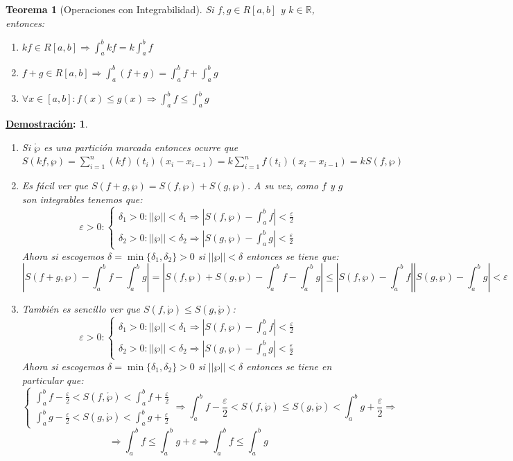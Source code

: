 \documentclass[10pt,a4paper,openright]{book}
\theoremstyle{break}
\newtheorem*{theo}{Teorema}
\newtheorem*{demo}{\underline{Demostración}:}
\begin{document}
\begin{theo}[Operaciones con Integrabilidad]
Si $f,g\in R[a,b]$ y $k\in \mathbb R$, entonces:
\begin{enumerate}
\item $kf\in R[a,b]\Rightarrow \int_a^b kf = k\int_a^b f$
\item $f+g\in R[a,b]\Rightarrow \int_a^b (f+g)=\int_a^b f+\int_a^b g$
\item $\forall x\in [a,b]: f(x)\leq g(x)\Rightarrow \int_a^b f \leq \int_a^b g$
\end{enumerate}
\end{theo}
\begin{demo}
\begin{enumerate}
\item Si $\mathring{\wp}$ es una partición marcada entonces ocurre que $S(kf,\wp) = \sum_{i=1}^n(kf)(t_i)(x_i-x_{i-1})=k\sum_{i=1}^n f(t_i)(x_i-x_{i-1})=kS(f,\wp)$

\item Es fácil ver que $S(f+g, \wp)=S(f,\wp)+S(g,\wp)$. A su vez, como $f$ y $g$ son integrables tenemos que:
$$\varepsilon > 0 : \begin{cases}\delta_1>0: ||\wp ||<\delta_1\Rightarrow \left|S(f,\wp)-\int_a^b f\right|<\frac{\varepsilon}{2} \\ \delta_2>0: ||\wp ||<\delta_2\Rightarrow \left|S(g,\wp)-\int_a^b g\right|<\frac{\varepsilon}{2}  \end{cases}$$
Ahora si escogemos $\delta = \min\{\delta_1, \delta_2\}>0$ si $||\wp ||<\delta$ entonces se tiene que:
$$\left| S(f+g,\wp)-\int_a^b f-\int_a^b g \right|=\left|S(f,\wp)+S(g,\wp)-\int_a^b f-\int_a^b g\right| \leq \left|S(f,\wp)-\int_a^b f\right|\left| S(g,\wp)-\int_a^b g\right| <\varepsilon $$

\item También es sencillo ver que $S(f,\mathring{\wp}) \leq S(g,\mathring{\wp})$:
$$\varepsilon > 0 : \begin{cases}\delta_1>0: ||\wp ||<\delta_1\Rightarrow \left|S(f,\wp)-\int_a^b f\right|<\frac{\varepsilon}{2} \\ \delta_2>0: ||\wp ||<\delta_2\Rightarrow \left|S(g,\wp)-\int_a^b g\right|<\frac{\varepsilon}{2}  \end{cases}$$
Ahora si escogemos $\delta = \min\{\delta_1, \delta_2\}>0$ si $||\wp ||<\delta$ entonces se tiene en particular que:
$$\begin{cases} \int_{a}^{b} f -\frac{\varepsilon}{2} < S(f,\mathring{\wp}) < \int_{a}^{b} f + \frac{\varepsilon}{2} \\ \int_{a}^{b} g -\frac{\varepsilon}{2} < S(g,\mathring{\wp}) < \int_{a}^{b} g + \frac{\varepsilon}{2}\end{cases}\Rightarrow  \int_{a}^{b} f -\frac{\varepsilon}{2} < S(f,\mathring{\wp}) \leq S(g,\mathring{\wp}) < \int_{a}^{b} g + \frac{\varepsilon}{2}\Rightarrow $$
$$\Rightarrow \int_{a}^{b}f\leq \int_{a}^{b}g +\varepsilon\Rightarrow \int_{a}^{b}f\leq \int_{a}^{b}g$$
\end{enumerate}
\end{demo}
\end{document}
